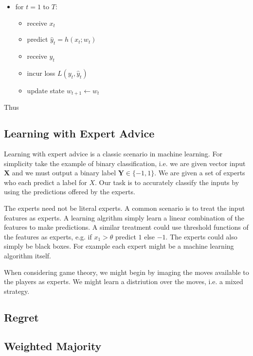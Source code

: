 \documentclass{article}
\begin{document}
\begin{itemize}
\item for $t = 1$ to $T$:
    \begin{itemize}
    \item receive $x_t$
    \item predict $\hat{y}_t = h(x_t; w_t)$
    \item receive $y_t$
    \item incur loss $L(y_t, \hat{y}_t)$
    \item update state $w_{t+1} \leftarrow w_t$
    \end{itemize}
\end{itemize}

Thus 

\subsection{Learning with Expert Advice}

Learning with expert advice is a classic scenario in machine learning. For simplicity take the example of binary classification, i.e. we are given vector input $\textbf{X}$ and we must output a binary label $\textbf{Y} \in \lbrace -1,1 \rbrace$. We are given a set of experts who each predict a label for $X$. Our task is to accurately classify the inputs by using the predictions offered by the experts.

The experts need not be literal experts. A common scenario is to treat the input features as experts. A learning algrithm simply learn a linear combination of the features to make predictions. A similar treatment could use threshold functions of the features as experts, e.g. if $x_1 > \theta$ predict $1$ else $-1$. The experts could also simply be black boxes. For example each expert might be a machine learning algorithm itself.

When considering game theory, we might begin by imaging the moves available to the players as experts. We might learn a distriution over the moves, i.e. a mixed strategy.


\subsection{Regret}

\subsection{Weighted Majority}
\end{document}
